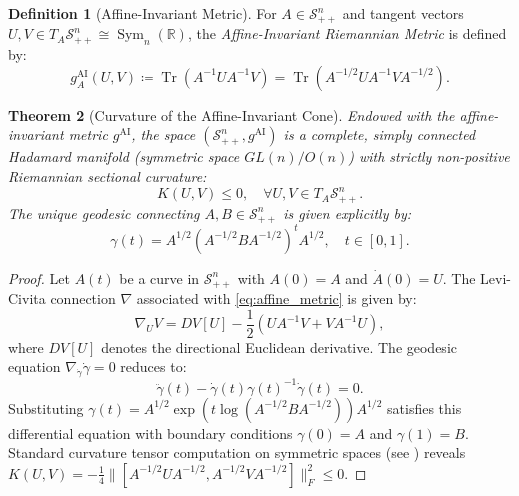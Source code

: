 \documentclass[11pt,a4paper,reqno]{amsart}
\newtheorem{theorem}{Theorem}[section]
\theoremstyle{definition}
\newtheorem{definition}[theorem]{Definition}
\numberwithin{equation}{section}
\newcommand{\R}{\mathbb{R}}
\newcommand{\Tr}{\operatorname{Tr}}
\begin{document}
\begin{definition}[Affine-Invariant Metric]
For $A \in \mathcal{S}_{++}^n$ and tangent vectors $U, V \in T_A \mathcal{S}_{++}^n \cong \operatorname{Sym}_n(\R)$, the \emph{Affine-Invariant Riemannian Metric} is defined by:
\begin{equation}
    \label{eq:affine_metric}
    g_A^{\mathrm{AI}}(U, V) \coloneqq \Tr\left( A^{-1} U A^{-1} V \right) = \Tr\left( A^{-1/2} U A^{-1} V A^{-1/2} \right).
\end{equation}
\end{definition}

\begin{theorem}[Curvature of the Affine-Invariant Cone]
\label{thm:cone_curvature}
Endowed with the affine-invariant metric $g^{\mathrm{AI}}$, the space $(\mathcal{S}_{++}^n, g^{\mathrm{AI}})$ is a complete, simply connected Hadamard manifold (symmetric space $GL(n)/O(n)$) with strictly non-positive Riemannian sectional curvature:
\begin{equation}
    K(U, V) \le 0, \quad \forall U, V \in T_A \mathcal{S}_{++}^n.
\end{equation}
The unique geodesic connecting $A, B \in \mathcal{S}_{++}^n$ is given explicitly by:
\begin{equation}
    \label{eq:cone_geodesic}
    \gamma(t) = A^{1/2} \left( A^{-1/2} B A^{-1/2} \right)^t A^{1/2}, \quad t \in [0, 1].
\end{equation}
\end{theorem}
\begin{proof}
Let $A(t)$ be a curve in $\mathcal{S}_{++}^n$ with $A(0) = A$ and $\dot{A}(0) = U$. The Levi-Civita connection $\nabla$ associated with \eqref{eq:affine_metric} is given by:
\begin{equation}
    \nabla_U V = D V[U] - \frac{1}{2}(U A^{-1} V + V A^{-1} U),
\end{equation}
where $D V[U]$ denotes the directional Euclidean derivative. The geodesic equation $\nabla_{\dot{\gamma}} \dot{\gamma} = 0$ reduces to:
\begin{equation}
    \ddot{\gamma}(t) - \dot{\gamma}(t) \gamma(t)^{-1} \dot{\gamma}(t) = 0.
\end{equation}
Substituting $\gamma(t) = A^{1/2} \exp(t \log(A^{-1/2} B A^{-1/2})) A^{1/2}$ satisfies this differential equation with boundary conditions $\gamma(0) = A$ and $\gamma(1) = B$. Standard curvature tensor computation on symmetric spaces (see \cite{bhatia2009positive}) reveals $K(U, V) = -\frac{1}{4} \|[A^{-1/2} U A^{-1/2}, A^{-1/2} V A^{-1/2}]\|_F^2 \le 0$.
\end{proof}
\end{document}
